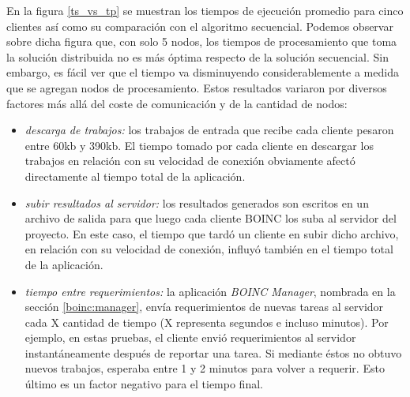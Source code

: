 En la figura \ref{ts_vs_tp} se muestran los tiempos de ejecución promedio para cinco clientes así como su comparación con el algoritmo secuencial. Podemos observar sobre dicha figura que, con solo 5 nodos, los tiempos de procesamiento que toma la solución distribuida no es más óptima respecto de la solución secuencial. Sin embargo, es fácil ver que el tiempo va disminuyendo considerablemente a medida que se agregan nodos de procesamiento. Estos resultados variaron por diversos factores más allá del coste de comunicación y de la cantidad de nodos:

\begin{itemize}

  \item \textit{descarga de trabajos:} los trabajos de entrada que recibe cada cliente pesaron entre 60kb y 390kb. El tiempo tomado por cada cliente en descargar los trabajos en relación con su velocidad de conexión obviamente afectó directamente al tiempo total de la aplicación.

  \item \textit{subir resultados al servidor:} los resultados generados son escritos en un archivo de salida para que luego cada cliente BOINC los suba al servidor del proyecto. En este caso, el tiempo que tardó un cliente en subir dicho archivo, en relación con su velocidad de conexión, influyó también en el tiempo total de la aplicación.

  \item \textit{tiempo entre requerimientos:} la aplicación \textit{BOINC Manager}, nombrada en la sección \ref{boinc:manager}, envía requerimientos de nuevas tareas al servidor cada X cantidad de tiempo (X representa segundos e incluso minutos). Por ejemplo, en estas pruebas, el cliente envió requerimientos al servidor instantáneamente después de reportar una tarea. Si mediante éstos no obtuvo nuevos trabajos, esperaba entre 1 y 2 minutos para volver a requerir. Esto último es un factor negativo para el tiempo final.

\end{itemize}
\label{factores:tiempo}


